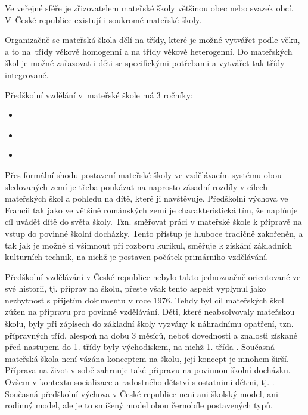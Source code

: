 		Ve veřejné sféře je zřizovatelem mateřské školy většinou obec nebo svazek obcí. V České republice existují i soukromé mateřské školy.

		Organizačně se mateřská škola dělí na třídy, které je možné vytvářet podle věku, a to na třídy věkově homogenní a na třídy věkově heterogenní. Do mateřských škol je možné zařazovat i děti se specifickými potřebami a vytvářet tak třídy integrované. 

		
		Předškolní vzdělání v mateřské škole má 3 ročníky:
		
	\begin{itemize}
		\setlength\itemsep{-2mm}
		\item [] \textit{}
		\item [] \textit{}
		\item [] \textit {} \citep[s.~71]{Organizace}
	\end{itemize}

Přes formální shodu postavení mateřské školy ve vzdělávacím systému obou sledovaných zemí je třeba poukázat na naprosto zásadní rozdíly v cílech mateřských škol a pohledu na dítě, které ji navštěvuje.
Předškolní výchova ve Francii tak jako ve většině románských zemí je charakteristická tím, že naplňuje cíl uvádět dítě do světa školy. Tzn. směřovat práci v mateřské škole k přípravě na vstup do povinné školní docházky. Tento přístup je hluboce tradičně zakořeněn, a tak jak je možné si všimnout při rozboru kurikul, směřuje k získání základních kulturních technik, na nichž je postaven počátek primárního vzdělávání. 

Předškolní vzdělávání v České republice nebylo takto jednoznačně orientované ve své historii, tj. příprav na školu, přeste však tento aspekt vyplynul jako nezbytnost s přijetím dokumentu  v roce 1976. Tehdy byl cíl mateřských škol zúžen na přípravu pro povinné vzdělávání. Děti, které neabsolvovaly mateřskou školu, byly při zápisech do základní školy vyzvány k náhradnímu opatření, tzn. přípravných tříd, alespoň na dobu 3 měsíců, neboť dovednosti a znalosti získané před nastupem do 1. třídy byly východiskem, na nichž 1. třída . Současná mateřská škola není vázána konceptem na školu, její koncept je mnohem širší. Příprava na život v sobě zahrnuje také připravu na povinnou školní docházku. Ovšem v kontextu socializace a radostného dětství s ostatnimi dětmi, tj. . Současná předškolní výchova v České republice neni ani školský model, ani rodinný model, ale je to smíšený model obou černobíle postavených typů.

